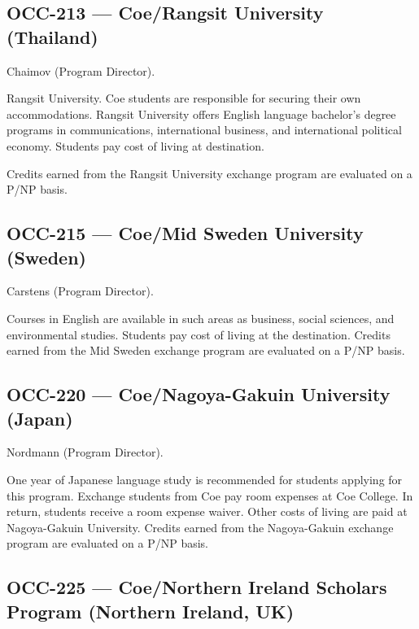 \documentclass[
  letterpaper,
]{scrbook}
\begin{document}
\hypertarget{occ-213-coerangsit-university-thailand}{%
\subsection{OCC-213 --- Coe/Rangsit University
(Thailand)}\label{occ-213-coerangsit-university-thailand}}

Chaimov (Program Director).

Rangsit University. Coe students are responsible for securing their own
accommodations. Rangsit University offers English language bachelor's
degree programs in communications, international business, and
international political economy. Students pay cost of living at
destination.

Credits earned from the Rangsit University exchange program are
evaluated on a P/NP basis.

\hypertarget{occ-215-coemid-sweden-university-sweden}{%
\subsection{OCC-215 --- Coe/Mid Sweden University
(Sweden)}\label{occ-215-coemid-sweden-university-sweden}}

Carstens (Program Director).

Courses in English are available in such areas as business, social
sciences, and environmental studies. Students pay cost of living at the
destination. Credits earned from the Mid Sweden exchange program are
evaluated on a P/NP basis.

\hypertarget{occ-220-coenagoya-gakuin-university-japan}{%
\subsection{OCC-220 --- Coe/Nagoya-Gakuin University
(Japan)}\label{occ-220-coenagoya-gakuin-university-japan}}

Nordmann (Program Director).

One year of Japanese language study is recommended for students applying
for this program. Exchange students from Coe pay room expenses at Coe
College. In return, students receive a room expense waiver. Other costs
of living are paid at Nagoya-Gakuin University. Credits earned from the
Nagoya-Gakuin exchange program are evaluated on a P/NP basis.

\hypertarget{occ-225-coenorthern-ireland-scholars-program-northern-ireland-uk}{%
\subsection{OCC-225 --- Coe/Northern Ireland Scholars Program (Northern
Ireland,
UK)}\label{occ-225-coenorthern-ireland-scholars-program-northern-ireland-uk}}
\end{document}

